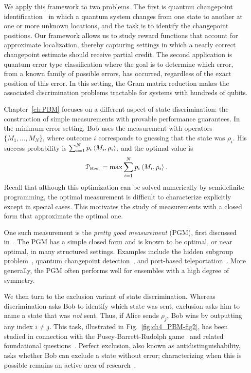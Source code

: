 We apply this framework to two problems. 
The first is quantum changepoint identification~\cite{sentis2016quantum, sentis2017exact, sentis2018online} in which a quantum system changes from one state to another at one or more unknown locations, and the task is to identify the changepoint positions. 
Our framework allows us to study 
reward functions that account for approximate localization, thereby capturing settings in which a nearly correct changepoint estimate should receive partial credit. 
The second application is quantum error type classification where the goal is to determine which error, from a known family of possible errors, has occurred, regardless of the exact position of this error. 
In this setting, the Gram matrix reduction makes the associated discrimination problems tractable for systems with hundreds of qubits.

Chapter~\ref{ch:PBM} focuses on a different aspect of state discrimination: the construction of simple measurements with provable performance guarantees. 
In the minimum-error setting, Bob uses the measurement with operators $\{M_1, \ldots, M_N\}$, where outcome $i$ corresponds to guessing that the state was $\rho_i$. 
His success probability is $\sum_{i=1}^N p_i \left\langle M_i, \rho_i \right\rangle$, and the optimal value is
\begin{equation}
    \label{eq:ch4_PBM-P_best}
    \mathcal{P}_{\mathrm{Best}} = \max \sum_{i=1}^N p_i \left\langle M_i, \rho_i \right\rangle.
\end{equation}
Recall that although this optimization can be solved numerically by semidefinite programming, the optimal measurement is difficult to characterize explicitly except in special cases. 
This motivates the study of measurements with a closed form that approximate the optimal one.

One such measurement is the \emph{pretty good measurement} (PGM), first discussed in~\cite{belavkin1975optimaldist, belavkin1975optimal, hughston1993complete, hausladen1994pretty}. 
The PGM has a simple closed form and is known to be optimal, or near optimal, in many structured settings. 
Examples include the hidden subgroup problem~\cite{bacon2005optimal, moore2005distinguishing}, quantum changepoint detection~\cite{sentis2016quantum}, and port-based teleportation~\cite{leditzky2022optimality}. 
More generally, the PGM often performs well for ensembles with a high degree of symmetry.

We then turn to the exclusion variant of state discrimination. 
Whereas discrimination asks Bob to identify which state was sent, exclusion asks him to name a state that was \emph{not} sent. 
Thus, if Alice sends $\rho_j$, Bob wins by outputting any index $i \neq j$. 
This task, illustrated in Fig.~\ref{fig:ch4_PBM-fig2}, has been studied in connection with the Pusey-Barrett-Rudolph game~\cite{pusey2012reality} and related foundational questions~\cite{bandyopadhyay2014conclusive}. 
Perfect exclusion, also known as antidistinguishability, asks whether Bob can exclude a state without error; characterizing when this is possible remains an active area of research~\cite{caves2002quantum, havlivcek2020simple, russo2023inner, leifer2020noncontextuality, mishra2023optimal, uola2020all, johnston2023tight}.


